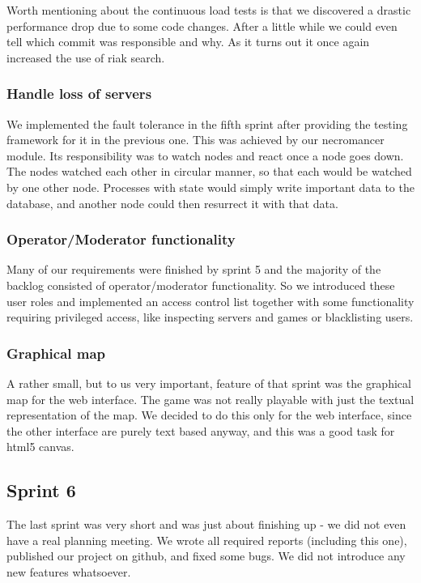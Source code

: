 \documentclass[11pt,a4paper]{report}
\begin{document}
Worth mentioning about the continuous load tests is that we discovered a drastic performance drop
due to some code changes.
After a little while we could even tell which commit was responsible and why.
As it turns out it once again increased the use of riak search.

\subsubsection{Handle loss of servers}
We implemented the fault tolerance in the fifth sprint after providing the testing framework for it in the previous one.
This was achieved by our necromancer module.
Its responsibility was to watch nodes and react once a node goes down.
The nodes watched each other in circular manner, so that each would be watched by one other node.
Processes with state would simply write important data to the database,
and another node could then resurrect it with that data.

\subsubsection{Operator/Moderator functionality}
Many of our requirements were finished by sprint 5 and the majority of the backlog consisted of
operator/moderator functionality.
So we introduced these user roles and implemented an access control list together with some
functionality requiring privileged access, like inspecting servers and games or blacklisting users.

\subsubsection{Graphical map}
A rather small, but to us very important, feature of that sprint was the graphical map for the web interface.
The game was not really playable with just the textual representation of the map.
We decided to do this only for the web interface, since the other interface are purely text based anyway,
and this was a good task for html5 canvas.

\subsection*{Sprint 6}
The last sprint was very short and was just about finishing up - we did not even have a real planning meeting.
We wrote all required reports (including this one), published our project on github,
and fixed some bugs.
We did not introduce any new features whatsoever.
\end{document}
